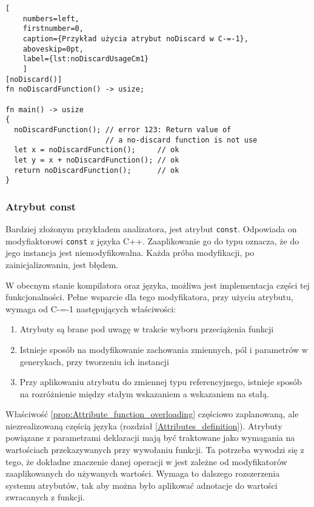 \begin{minipage}{\linewidth}
  
  \begin{lstlisting}[
    numbers=left,
    firstnumber=0,
    caption={Przykład użycia atrybut noDiscard w C-=-1},
    aboveskip=0pt,
    label={lst:noDiscardUsageCm1}
    ]
[noDiscard()]
fn noDiscardFunction() -> usize;

fn main() -> usize
{
  noDiscardFunction(); // error 123: Return value of
                       // a no-discard function is not use
  let x = noDiscardFunction();     // ok
  let y = x + noDiscardFunction(); // ok
  return noDiscardFunction();      // ok
}
\end{lstlisting}
\end{minipage}

\subsubsection{Atrybut const}
\label{const}

Bardziej złożonym przykładem analizatora, jest atrybut \lstinline{const}.
Odpowiada on modyfiaktorowi \lstinline{const} z języka C++.
Zaaplikowanie go do typu oznacza, że do jego instancja jest niemodyfikowalna.
Każda próba modyfikacji, po zainicjalizowaniu, jest błędem.

W obecnym stanie kompilatora oraz języka, możliwa jest implementacja części tej funkcjonalności.
Pełne wsparcie dla tego modyfikatora, przy użyciu atrybutu, wymaga od C-=-1 następujących właściwości:
\begin{enumerate}
  \item \label{prop:Attribute_function_overloading} Atrybuty są brane pod uwagę w trakcie wyboru przeciążenia funkcji
  \item \label{prop:Generic_adnotations} Istnieje sposób na modyfikowanie zachowania zmiennych, pól i parametrów w generykach, przy tworzeniu ich instancji
  \item \label{prop:Reference_adnotations} Przy aplikowaniu atrybutu do zmiennej typu referencyjnego, istnieje sposób na rozróżnienie między stałym wskazaniem a wskazaniem na stałą.
\end{enumerate}

Właściwość \ref{prop:Attribute_function_overloading} częściowo zaplanowaną, ale niezrealizowaną częścią języka (rozdział \ref{Attributes_definition}).
Atrybuty powiązane z parametrami deklaracji mają być traktowane jako wymagania na wartościach przekazywanych przy wywołaniu funkcji.
Ta potrzeba wywodzi się z tego, że dokładne znaczenie danej operacji w jest zależne od modyfikatorów zaaplikowanych do używanych wartości. %
Wymaga to dalszego rozszerzenia systemu atrybutów, tak aby można było aplikować adnotacje do wartości zwracanych z funkcji.


